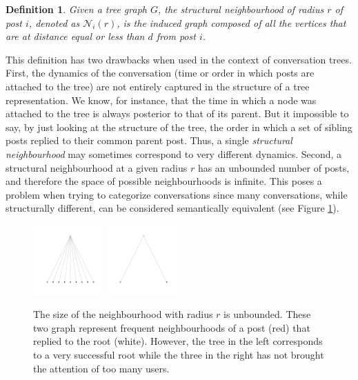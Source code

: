 \documentclass[conference]{IEEEtran}
\newtheorem{definition}{Definition}
\begin{document}
\begin{definition}
Given a tree graph $G$, the \textit{structural neighbourhood} of radius $r$ of post $i$, denoted as $\mathcal{N}_i(r)$, is the induced graph composed of all the vertices that are at distance equal or less than $d$ from post $i$.
\end{definition}
This definition has two drawbacks when used in the context of conversation trees.
First, the dynamics of the conversation (time or order in which posts are attached to the tree) are not entirely captured in the structure of a tree representation. We know, for instance, that the time in which a node was attached to the tree is always posterior to that of its parent. But it impossible to say, by just looking at the structure of the tree, the order in which a set of sibling posts replied to their common parent post. Thus, a single \textit{structural neighbourhood} may sometimes correspond to very different dynamics.
Second, a structural neighbourhood at a given radius $r$ has an unbounded number of posts, and therefore the space of possible neighbourhoods is infinite. This poses a problem when trying to categorize conversations since many conversations, while structurally different, can be considered semantically equivalent (see Figure \ref{fig:large_neighbourhood}).

\begin{figure}
	\centering
	\includegraphics[width=0.24\textwidth]{large_neighbourhood}
	\includegraphics[width=0.24\textwidth]{small_neighbourhood}
	\caption{The size of the neighbourhood with radius $r$ is unbounded. These two graph represent frequent neighbourhoods of a post (red) that replied to the root (white). However, the tree in the left corresponds to a very successful root while the three in the right has not brought the attention of too many users.}
	\label{fig:large_neighbourhood}
\end{figure}
\end{document}
